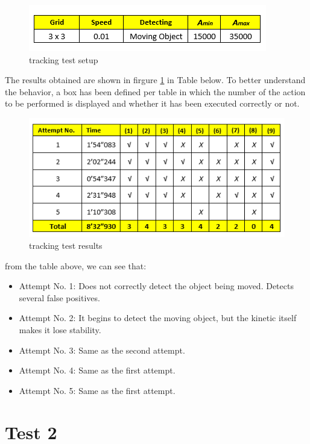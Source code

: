 \begin{figure}[ht]
\centering
\includegraphics[scale=0.8]{figures/tracking_test_settings_1.png}
\caption{tracking test setup}
\label{tracking_test_setup}
\end{figure}

The results obtained are shown in firgure \ref{} in Table below. To better understand the behavior, a box has been defined per table in which the number of the action to be performed is displayed and whether it has been executed correctly or not.

\begin{figure}[ht]
\centering
\includegraphics[scale=0.8]{figures/tracking_test_results_1.png}
\caption{tracking test results}
\label{tracking_test_results_1}
\end{figure}

from the table above, we can see that:

\begin{itemize}
\item Attempt No. 1: Does not correctly detect the object being moved. Detects several false positives.
\item Attempt No. 2: It begins to detect the moving object, but the kinetic itself makes it lose stability.
\item Attempt No. 3: Same as the second attempt.
\item Attempt No. 4: Same as the first attempt.
\item Attempt No. 5: Same as the first attempt.
\end{itemize}

\section{Test 2}

